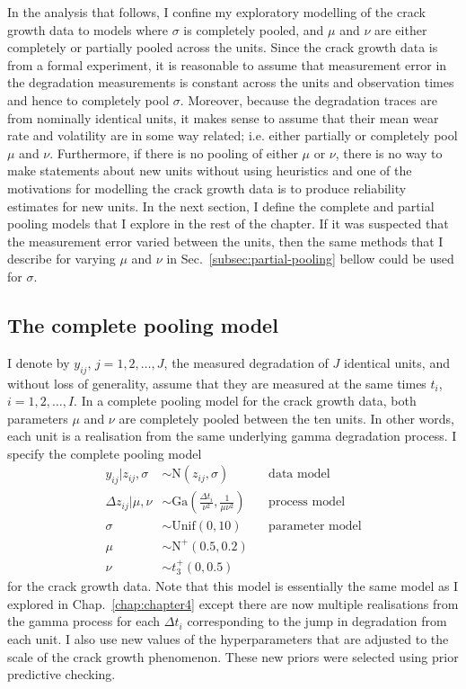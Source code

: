 In the analysis that follows, I confine my exploratory modelling of the crack growth data to models where $\sigma$ is completely pooled, and $\mu$ and $\nu$ are either completely or partially pooled across the units. Since the crack growth data is from a formal experiment, it is reasonable to assume that measurement error in the degradation measurements is constant across the units and observation times and hence to completely pool $\sigma$. Moreover, because the degradation traces are from nominally identical units, it makes sense to assume that their mean wear rate and volatility are in some way related; i.e. either partially or completely pool $\mu$ and $\nu$. Furthermore, if there is no pooling of either $\mu$ or $\nu$, there is no way to make statements about new units without using heuristics and one of the motivations for modelling the crack growth data is to produce reliability estimates for new units. In the next section, I define the complete and partial pooling models that I explore in the rest of the chapter. If it was suspected that the measurement error varied between the units, then the same methods that I describe for varying $\mu$ and $\nu$ in Sec.~\ref{subsec:partial-pooling} bellow could be used for $\sigma$.

\subsection{The complete pooling model}
\label{subsec:complete-pooling}

I denote by $y_{ij}$, $j = 1, 2, \ldots, J$, the measured degradation of $J$ identical units, and without loss of generality, assume that they are measured at the same times $t_i$, $i = 1, 2, \ldots, I$. In a complete pooling model for the crack growth data, both parameters $\mu$ and $\nu$ are completely pooled between the ten units. In other words, each unit is a realisation from the same underlying gamma degradation process. I specify the complete pooling model 
\begin{align*} 
   y_{ij}|z_{ij}, \sigma & \sim \mbox{N}(z_{ij}, \sigma) && \mbox{data model} \\
   \Delta z_{ij}|\mu, \nu & \sim \mbox{Ga} \left( \frac{\Delta t_{i}}{\nu^2}, \frac{1}{\mu \nu^2} \right) && \mbox{process model} \\
   \sigma & \sim \mbox{Unif}(0, 10) && \mbox{parameter model} \\
   \mu & \sim \mbox{N}^{+}(0.5, 0.2) \\
   \nu & \sim t^{+}_3(0, 0.5)
\end{align*}
for the crack growth data. Note that this model is essentially the same model as I explored in Chap.~\ref{chap:chapter4} except there are now multiple realisations from the gamma process for each $\Delta t_{i}$ corresponding to the jump in degradation from each unit. I also use new values of the hyperparameters that are adjusted to the scale of the crack growth phenomenon. These new priors were selected using prior predictive checking.

